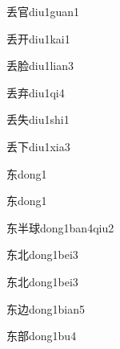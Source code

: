 \begin{verbete}[6;8]{丢官}{diu1guan1}
\end{verbete}

\begin{verbete}[6;4]{丢开}{diu1kai1}
\end{verbete}

\begin{verbete}[6;11]{丢脸}{diu1lian3}
\end{verbete}

\begin{verbete}[6;7]{丢弃}{diu1qi4}
\end{verbete}

\begin{verbete}[6;5]{丢失}{diu1shi1}
\end{verbete}

\begin{verbete}[6;3]{丢下}{diu1xia3}
\end{verbete}

\begin{verbete}[5]{东}{dong1}
\end{verbete}
\begin{verbete*}[5]{东}{dong1}
\end{verbete*}

\begin{verbete*}[5;5;11]{东半球}{dong1ban4qiu2}
\end{verbete*}

\begin{verbete}[5;5]{东北}{dong1bei3}
\end{verbete}
\begin{verbete*}[5;5]{东北}{dong1bei3}
\end{verbete*}

\begin{verbete}[5;5]{东边}{dong1bian5}
\end{verbete}

\begin{verbete}[5;10]{东部}{dong1bu4}
\end{verbete}

